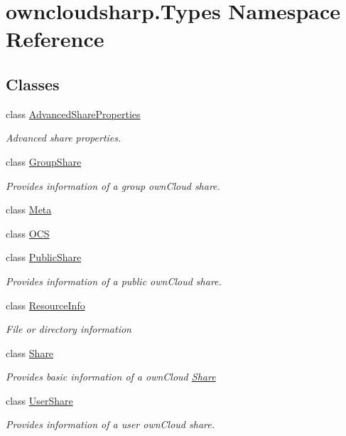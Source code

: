 \hypertarget{namespaceowncloudsharp_1_1_types}{}\section{owncloudsharp.\+Types Namespace Reference}
\label{namespaceowncloudsharp_1_1_types}
\subsection*{Classes}
\begin{DoxyCompactItemize}
\item 
class \hyperlink{classowncloudsharp_1_1_types_1_1_advanced_share_properties}{Advanced\+Share\+Properties}
\begin{DoxyCompactList}\small\item\em Advanced share properties. \end{DoxyCompactList}\item 
class \hyperlink{classowncloudsharp_1_1_types_1_1_group_share}{Group\+Share}
\begin{DoxyCompactList}\small\item\em Provides information of a group own\+Cloud share. \end{DoxyCompactList}\item 
class \hyperlink{classowncloudsharp_1_1_types_1_1_meta}{Meta}
\item 
class \hyperlink{classowncloudsharp_1_1_types_1_1_o_c_s}{O\+C\+S}
\item 
class \hyperlink{classowncloudsharp_1_1_types_1_1_public_share}{Public\+Share}
\begin{DoxyCompactList}\small\item\em Provides information of a public own\+Cloud share. \end{DoxyCompactList}\item 
class \hyperlink{classowncloudsharp_1_1_types_1_1_resource_info}{Resource\+Info}
\begin{DoxyCompactList}\small\item\em File or directory information \end{DoxyCompactList}\item 
class \hyperlink{classowncloudsharp_1_1_types_1_1_share}{Share}
\begin{DoxyCompactList}\small\item\em Provides basic information of a own\+Cloud \hyperlink{classowncloudsharp_1_1_types_1_1_share}{Share} \end{DoxyCompactList}\item 
class \hyperlink{classowncloudsharp_1_1_types_1_1_user_share}{User\+Share}
\begin{DoxyCompactList}\small\item\em Provides information of a user own\+Cloud share. \end{DoxyCompactList}\end{DoxyCompactItemize}
